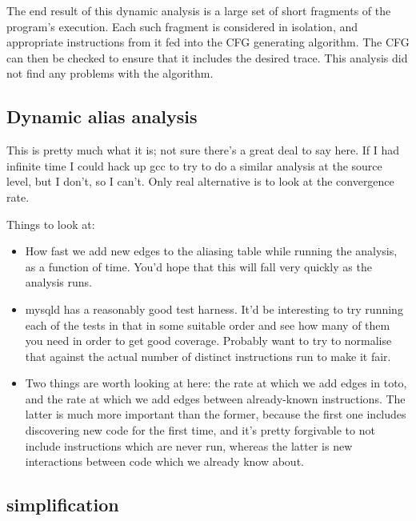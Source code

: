 The end result of this dynamic analysis is a large set of short
fragments of the program's execution.  Each such fragment is
considered in isolation, and appropriate instructions
from it fed into the CFG generating algorithm.  The CFG can then be
checked to ensure that it includes the desired trace.  This analysis
did not find any problems with the algorithm.


\subsection{Dynamic alias analysis}

This is pretty much what it is; not sure there's a great deal to say
here.  If I had infinite time I could hack up gcc to try to do a
similar analysis at the source level, but I don't, so I can't.  Only
real alternative is to look at the convergence rate.

Things to look at:

\begin{itemize}
\item How fast we add new edges to the aliasing table while running
  the analysis, as a function of time.  You'd hope that this will fall
  very quickly as the analysis runs.
\item mysqld has a reasonably good test harness.  It'd be interesting
  to try running each of the tests in that in some suitable order and
  see how many of them you need in order to get good coverage.
  Probably want to try to normalise that against the actual number of
  distinct instructions run to make it fair.
\item Two things are worth looking at here: the rate at which we add
  edges in toto, and the rate at which we add edges between
  already-known instructions.  The latter is much more important than
  the former, because the first one includes discovering new code for
  the first time, and it's pretty forgivable to not include
  instructions which are never run, whereas the latter is new
  interactions between code which we already know about.
\end{itemize}

\subsection{{\STateMachine} simplification}

